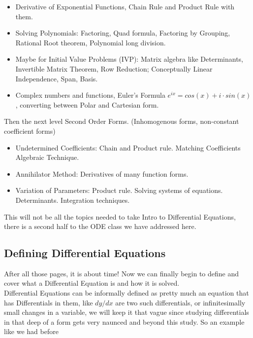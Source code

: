 \documentclass[12pt]{article}
\begin{document}
\begin{itemize}
    \item Derivative of Exponential Functions, Chain Rule and Product Rule with them.
    \item Solving Polynomials: Factoring, Quad formula, Factoring by Grouping, Rational Root theorem, Polynomial long division.
    \item Maybe for Initial Value Problems (IVP): Matrix algebra like Determinants, Invertible Matrix Theorem, Row Reduction; Conceptually Linear Independence, Span, Basis.
    \item Complex numbers and functions, Euler's Formula $e^{ix}=cos(x)+i\cdot sin(x)$, converting between Polar and Cartesian form.
\end{itemize}

\vspace{20pt}

Then the next level Second Order Forms. (Inhomogenous forms, non-constant coefficient forms)

\begin{itemize}
    \item Undetermined Coefficients: Chain and Product rule. Matching Coefficients Algebraic Technique.
    \item Annihilator Method: Derivatives of many function forms.
    \item Variation of Parameters: Product rule. Solving systems of equations. Determinants. Integration techniques.
\end{itemize}

This will not be all the topics needed to take Intro to Differential Equations, there is a second half to the ODE class we have addressed here.

\subsection{Defining Differential Equations}

After all those pages, it is about time! Now we can finally begin to define and cover what a Differential Equation is and how it is solved. \\

Differential Equations can be informally defined as pretty much an equation that has Differentials in them, like $dy/dx$ are two such differentials, or infinitesimally small changes in a variable, we will keep it that vague since studying differentials in that deep of a form gets very naunced and beyond this study. So an example like we had before
\end{document}
